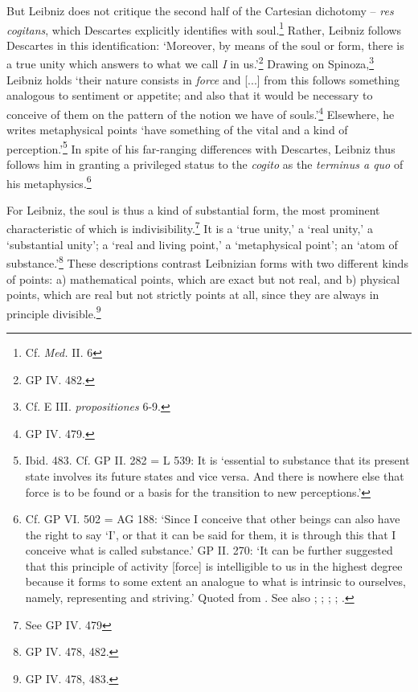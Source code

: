 \documentclass{article}
\begin{document}
But Leibniz does not critique the second half of the Cartesian dichotomy
-- \emph{res cogitans}, which Descartes explicitly identifies with
soul.\footnote{Cf. \emph{Med.} II. 6} Rather, Leibniz follows Descartes
in this identification: `Moreover, by means of the soul or form, there
is a true unity which answers to what we call \emph{I} in us.'\footnote{GP
  IV. 482.} Drawing on Spinoza,\footnote{Cf. E III. \emph{propositiones}
  6-9.} Leibniz holds `their nature consists in \emph{force} and
{[}...{]} from this follows something analogous to sentiment or
appetite; and also that it would be necessary to conceive of them on the
pattern of the notion we have of souls.'\footnote{GP IV. 479.}
Elsewhere, he writes metaphysical points `have something of the vital
and a kind of perception.'\footnote{Ibid. 483. Cf. GP II. 282 = L 539:
  It is `essential to substance that its present state involves its
  future states and vice versa. And there is nowhere else that force is
  to be found or a basis for the transition to new perceptions.'} In
spite of his far-ranging differences with Descartes, Leibniz thus
follows him in granting a privileged status to the \emph{cogito} as the
\emph{terminus a quo} of his metaphysics.\footnote{Cf. GP VI. 502 = AG
  188: `Since I conceive that other beings can also have the right to
  say `I', or that it can be said for them, it is through this that I
  conceive what is called substance.' GP II. 270: `It can be further
  suggested that this principle of activity {[}force{]} is intelligible
  to us in the highest degree because it forms to some extent an
  analogue to what is intrinsic to ourselves, namely, representing and
  striving.' Quoted from \autocite[1177]{Lodge2015}. See also \autocite[329-331]{Huffman1993}; \autocite[327-328, 338, 347-349]{Adams1993}; \autocite{Stevenson1997}; \autocite[63-81]{Heidegger1998}; \autocite{Lodge2015}.}

For Leibniz, the soul is thus a kind of substantial form, the most
prominent characteristic of which is indivisibility.\footnote{See GP IV.
  479} It is a `true unity,' a `real unity,' a `substantial unity'; a
`real and living point,' a `metaphysical point'; an `atom of
substance.'\footnote{GP IV. 478, 482.} These descriptions contrast
Leibnizian forms with two different kinds of points: a) mathematical
points, which are exact but not real, and b) physical points, which are
real but not strictly points at all, since they are always in principle
divisible.\footnote{GP IV. 478, 483.}
\end{document}
